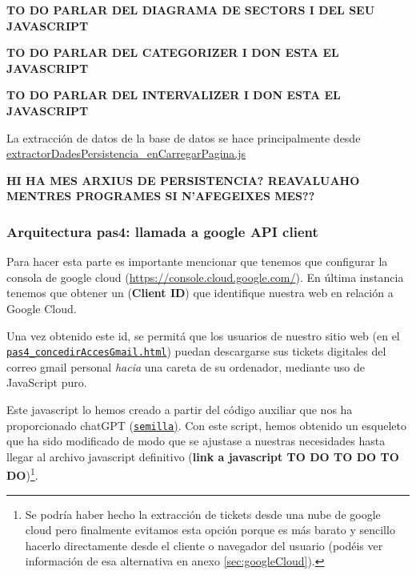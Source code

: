 \documentclass[a4paper,12pt]{report}
\begin{document}
	\textbf{TO DO PARLAR DEL DIAGRAMA DE SECTORS I DEL SEU JAVASCRIPT}
	
	\textbf{TO DO PARLAR DEL CATEGORIZER I DON ESTA EL JAVASCRIPT}
	
	\textbf{TO DO PARLAR DEL INTERVALIZER I DON ESTA EL JAVASCRIPT}
	
	
	
	La extracción de datos de la base de datos se hace principalmente desde \href{	https://github.com/blackcub3s/mercApp/blob/main/APP%20WEB/__frontend__produccio__/app/js/dashboard/extractorDadesPersistencia_enCarregarPagina.js}{extractorDadesPersistencia\_enCarregarPagina.js}
	
	\textbf{HI HA MES ARXIUS DE PERSISTENCIA? REAVALUAHO MENTRES PROGRAMES SI N'AFEGEIXES MES??}
	
	
	\subsubsection{Arquitectura pas4: llamada a google API client}
	\label{sec:pas4googleAPIclient}
	
	Para hacer esta parte es importante mencionar que tenemos que configurar la consola de google cloud (\href{https://console.cloud.google.com/}{https://console.cloud.google.com/}). En última instancia tenemos que obtener un (\textbf{Client ID}) que identifique nuestra web en relación a Google Cloud.
	
	Una vez obtenido este id, se permitá que los usuarios de nuestro sitio web (en el \href{https://github.com/blackcub3s/mercApp/blob/main/APP%20WEB/__frontend__produccio__/app/pas4_concedirAccesGmail.html}{\texttt{pas4\_concedirAccesGmail.html}}) puedan descargarse sus tickets digitales del correo gmail personal \textit{hacia} una careta de su ordenador, mediante uso de JavaScript puro.

	
	Este javascript lo hemos creado a partir del código auxiliar que nos ha proporcionado chatGPT (\href{https://github.com/blackcub3s/mercApp/blob/main/llavorsGPT/extraccionCorreosPdfGoogleCloud.html}{\texttt{semilla})}. Con este script, hemos obtenido un esqueleto que ha sido modificado de modo que se ajustase a nuestras necesidades hasta llegar al archivo javascript definitivo (\textbf{link a javascript TO DO TO DO TO DO})\footnote{Se podría haber hecho la extracción de tickets desde una nube de google cloud pero finalmente evitamos esta opción porque es más barato y sencillo hacerlo directamente desde el cliente o navegador del usuario (podéis ver información de esa alternativa en anexo \ref{sec:googleCloud}).}.
\end{document}

